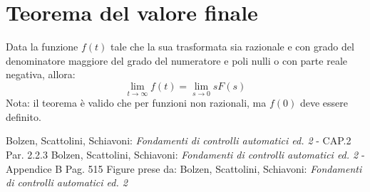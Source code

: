 \documentclass[a4paper]{report}
\begin{document}
\section{Teorema del valore finale}\label{teoremaValoreFinale}
Data la funzione $f(t)$ tale che la sua trasformata sia razionale e
con grado del denominatore maggiore del grado del numeratore e poli
nulli o con parte reale negativa, allora:
\begin{equation}
  \lim_{t \to \infty} f(t)=\lim_{s \to 0} s F(s)
\end{equation}
Nota: il teorema \`e valido che per funzioni non razionali, ma $f(0)$
deve essere definito.



































\begin{thebibliography}{99}
 Bolzen, Scattolini, Schiavoni: \emph{Fondamenti di controlli automatici ed. 2} - CAP.2 Par. 2.2.3
 Bolzen, Scattolini, Schiavoni: \emph{Fondamenti di controlli automatici ed. 2} - Appendice B Pag. 515
 Figure prese da: Bolzen, Scattolini, Schiavoni: \emph{Fondamenti di controlli automatici ed. 2} 
\end{thebibliography}

\printindex
\end{document}
